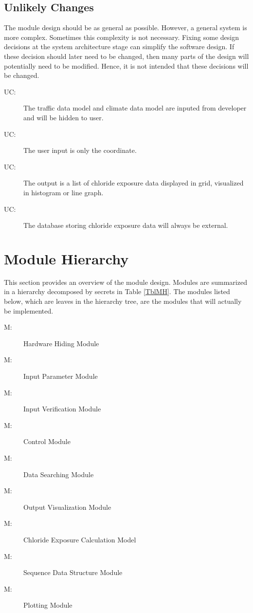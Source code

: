 \documentclass[12pt, titlepage]{article}
\newcounter{ucnum}
\newcommand{\uctheucnum}{UC\theucnum}
\newcounter{mnum}
\newcommand{\mthemnum}{M\themnum}
\begin{document}
\subsection{Unlikely Changes} \label{SecUchange}

The module design should be as general as possible. However, a general system is
more complex. Sometimes this complexity is not necessary. Fixing some design
decisions at the system architecture stage can simplify the software design. If
these decision should later need to be changed, then many parts of the design
will potentially need to be modified. Hence, it is not intended that these
decisions will be changed.

\begin{description}
\item[ \uctheucnum \label{ucDevInput}:] The traffic data model and climate data model are inputed from developer and will be hidden to user.
\item[ \uctheucnum \label{ucUserInput}:] The user input is only the coordinate.
\item [ \uctheucnum \label{ucOutput}:] The output is a list of chloride exposure data displayed in grid, visualized in histogram or line graph.
\item [ \uctheucnum \label{ucDatabase}:] The database storing chloride exposure data will always be external.
\end{description}

\section{Module Hierarchy} \label{SecMH}

This section provides an overview of the module design. Modules are summarized
in a hierarchy decomposed by secrets in Table \ref{TblMH}. The modules listed
below, which are leaves in the hierarchy tree, are the modules that will
actually be implemented.

\begin{description}
\item [ \mthemnum \label{mHardware}:] Hardware Hiding Module
\item [ \mthemnum \label{mInput}:] Input Parameter Module
\item [ \mthemnum \label{mInputVerification}:] Input Verification Module
\item [ \mthemnum \label{mControl}:] Control Module
\item [ \mthemnum \label{mSearch}:] Data Searching Module
\item [ \mthemnum \label{mOutput}:] Output Visualization Module
\item [ \mthemnum \label{mCalculation}:] Chloride Exposure Calculation Model
\item [ \mthemnum \label{mSeqData}:] Sequence Data Structure Module
\item [ \mthemnum \label{mPlot}:] Plotting Module
\end{description}
\end{document}
